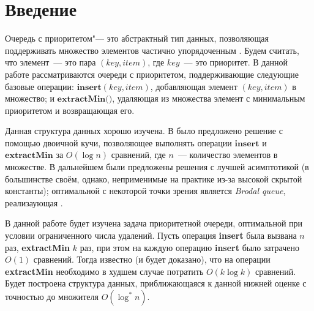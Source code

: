 \chapter*{Введение}							%


Очередь с приоритетом"--- это абстрактный тип данных, позволяющая поддерживать
множество элементов частично упорядоченным \cite{Cormen}. Будем считать, что элемент~---
это пара $(\textit{key}, \textit{item})$, где $key$~--- это приоритет.
В данной работе рассматриваются очереди с приоритетом, поддерживающие следующие
базовые операции: $\textbf{insert}(key, item)$, добавляющая элемент $(key, item)$
в множество; и $\textbf{extractMin()}$, удаляющая
из множества элемент с минимальным приоритетом и возвращающая его.

Данная структура данных хорошо изучена. В  было предложено решение с помощью двоичной кучи, позволяющее выполнять
операции $\textbf{insert}$ и $\textbf{extractMin}$ за $O(\log n)$ сравнений, где $n$~---
количество элементов в множестве. В дальнейшем были предложены решения с лучшей
асимптотикой (в большинстве своём, однако, неприменимые на практике из-за высокой
скрытой константы); оптимальной с некоторой точки зрения является 
\emph{Brodal queue}, реализаующая .

В данной работе будет изучена задача приоритетной очереди, оптимальной
при условии ограниченного числа удалений. Пусть операция \textbf{insert}
была вызвана $n$ раз, \textbf{extractMin} $k$ раз, при этом на каждую
операцию \textbf{insert} было затрачено $O(1)$ сравнений. Тогда известно
(и будет доказано), что на операции \textbf{extractMin} необходимо в худшем
случае потратить $O(k \log k)$ сравнений. Будет построена структура
данных, приближающаяся к данной нижней оценке с точностью до
множителя $O(\log^* n)$.



%
